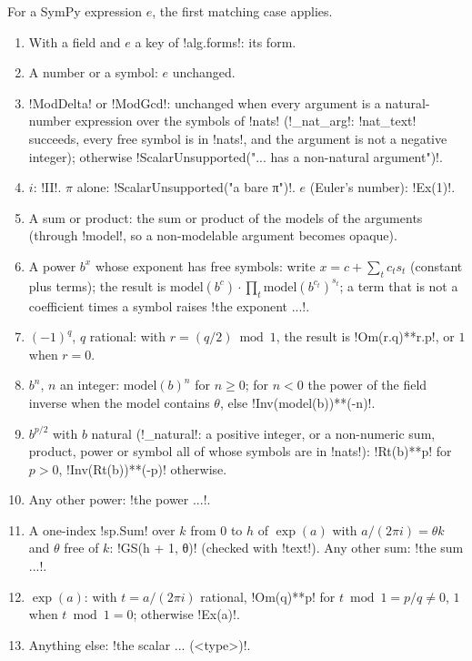 {{{\begin{algorithm}\label{alg:lean-export-model}
For a SymPy expression $e$, the first matching case applies.
\begin{enumerate}
\item With a field and $e$ a key of \lexpy!alg.forms!: its form.
\item A number or a symbol: $e$ unchanged.
\item \lexpy!ModDelta! or \lexpy!ModGcd!: unchanged when every argument is a natural-number
expression over the symbols of \lexpy!nats! (\lexpy!_nat_arg!: \lexpy!nat_text! succeeds, every free
symbol is in \lexpy!nats!, and the argument is not a negative integer); otherwise
\lexcode!ScalarUnsupported("... has a non-natural argument")!.
\item $i$: \lexpy!II!. $\pi$ alone: \lexcode!ScalarUnsupported("a bare π")!. $e$ (Euler's number):
\lexpy!Ex(1)!.
\item A sum or product: the sum or product of the models of the arguments (through
\lexpy!model!, so a non-modelable argument becomes opaque).
\item A power $b^{x}$ whose exponent has free symbols: write $x = c + \sum_t c_t s_t$ (constant
plus terms); the result is $\mathrm{model}(b^{c}) \cdot \prod_t \mathrm{model}(b^{c_t})^{s_t}$;
a term that is not a coefficient times a symbol raises \lexcode!the exponent ...!.
\item $(-1)^{q}$, $q$ rational: with $r = (q/2) \bmod 1$, the result is
\lexpy!Om(r.q)**r.p!, or $1$ when $r=0$.
\item $b^{n}$, $n$ an integer: $\mathrm{model}(b)^{n}$ for $n\ge 0$; for $n<0$ the power of the
field inverse when the model contains $\theta$, else \lexpy!Inv(model(b))**(-n)!.
\item $b^{p/2}$ with $b$ natural (\lexpy!_natural!: a positive integer, or a non-numeric sum,
product, power or symbol all of whose symbols are in \lexpy!nats!): \lexpy!Rt(b)**p! for $p>0$,
\lexpy!Inv(Rt(b))**(-p)! otherwise.
\item Any other power: \lexcode!the power ...!.
\item A one-index \lexpy!sp.Sum! over $k$ from 0 to $h$ of $\exp(a)$ with
$a/(2\pi i) = \theta k$ and $\theta$ free of $k$: \lexpy!GS(h + 1, θ)! (checked with \lexpy!text!).
Any other sum: \lexcode!the sum ...!.
\item $\exp(a)$: with $t = a/(2\pi i)$ rational, \lexpy!Om(q)**p! for $t \bmod 1 = p/q \neq 0$,
$1$ when $t \bmod 1 = 0$; otherwise \lexpy!Ex(a)!.
\item Anything else: \lexcode!the scalar ... (<type>)!.
\end{enumerate}
\end{algorithm}

}}}
